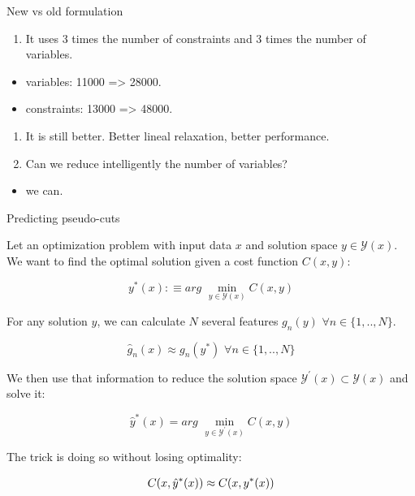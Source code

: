 \begin{frame}

\begin{block}{New vs old formulation}

\begin{enumerate}[<+->]

\item
  It uses 3 times the number of constraints and 3 times the number of
  variables.
\end{enumerate}

\begin{itemize}[<+->]

\item
  variables: 11000 =\textgreater{} 28000.
\item
  constraints: 13000 =\textgreater{} 48000.
\end{itemize}

\begin{enumerate}[<+->]

\item
  It is still better. Better lineal relaxation, better performance.
\item
  Can we reduce intelligently the number of variables?
\end{enumerate}

\begin{itemize}[<+->]

\item
  we can.
\end{itemize}

\end{block}

\end{frame}

\begin{frame}

\begin{block}{Predicting pseudo-cuts}

Let an optimization problem with input data \(x\) and solution space
\(y \in \mathcal{Y}(x)\). We want to find the optimal solution given a
cost function \(C(x,y)\):

\[
y^{*}(x) :\equiv arg \,\,\min_{y \in \mathcal{Y}(x)} C(x,y)
\]

For any solution \(y\), we can calculate \(N\) several features
\(g_n(y) \,\, \forall n \in \{1, .., N\}\).

\[
\hat{g}_n(x) \approx g_n(y^{*}) \,\, \forall n \in \{1, .., N\}
\]

We then use that information to reduce the solution space
\(\mathcal{Y}^\prime(x) \subset \mathcal{Y}(x)\) and solve it:

\[\hat{y}^{*}(x) = arg \,\,\min_{y \in \mathcal{Y}^\prime(x)} C(x,y)\]

The trick is doing so without losing optimality:

\begin{align}
    C(x,\hat{y}^{*}(x)) \approx  C(x,y^{*}(x) ) \notag
\end{align}

\end{block}

\end{frame}

